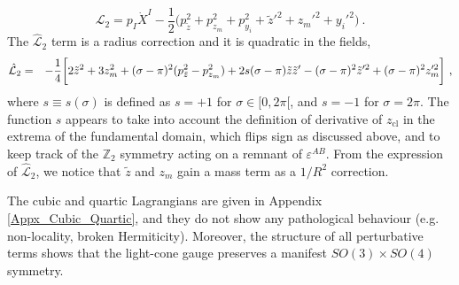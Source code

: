 \documentclass[12pt]{article}
\def\tz{\tilde{z}}
\numberwithin{equation}{section}
\begin{document}
\begin{equation}
\mathcal{L}_2 = p_I \dot{X}^I - \frac{1}{2}\bigg(p_{\tz}^2 + p_{z_m}^2 + p_{y_i}^2 + \tilde{z}'^2 + z_m'^2 + y_i'^2 \bigg) \ .
\end{equation}
The $\hat{\mathcal{L}}_2$ term is a radius correction and it is quadratic in the fields,
\begin{eqnarray}
\label{hatL2}
\notag
\hat{\mathcal{L}}_2 &=&-\frac{1}{4}\bigg[ 2 \tz^2 + 3 z_m^2 
+(\sigma-\pi) ^2 ( p_{\tz}^2- p_{z_m}^2 ) + 2s (\sigma-\pi) 
   \tz \tilde{z}'-(\sigma-\pi)^2 \tilde{z}'^2
   +(\sigma-\pi)^2 z_m'^2 \bigg]\ ,\\
\end{eqnarray}
where $s \equiv s(\sigma)$ is defined as $s = +1$ for $\sigma \in [0, 2\pi[$, and $s = -1$ for $\sigma = 2\pi$. The function $s$ appears to take into account the definition of derivative of $z_{\text{cl}}$ in the extrema of the fundamental domain, which flips sign as discussed above, and to keep track of the $\mathbb{Z}_2$ symmetry acting on a remnant of $\varepsilon^{AB}$. 
From the expression of $\hat{\mathcal{L}}_2$, we notice that $\tilde{z}$ and $z_m$ gain a mass term as a $1/R^2$ correction. 

The cubic and quartic Lagrangians are given in Appendix \ref{Appx_Cubic_Quartic}, and they do not show any pathological behaviour (e.g. non-locality, broken Hermiticity).  Moreover, the structure of all perturbative terms shows that the light-cone gauge preserves a manifest $SO(3) \times SO(4)$ symmetry. 
\end{document}
